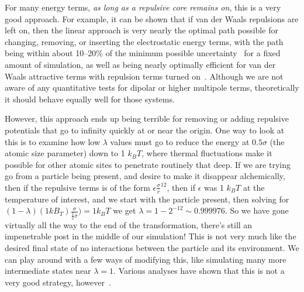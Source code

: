 \documentclass[9pt,bestpractices]{livecoms}
\begin{document}
For many energy terms, \textit{as long as a repulsive core remains on}, this is a very good approach. For example, it can be shown that if van der Waals repulsions are left on, then the linear approach is very nearly the optimal path possible for changing, removing, or inserting the electrostatic energy terms, with the path being within about 10--20\% of the minimum possible uncertainty~\cite{naden2015linear} for a fixed amount of simulation, as well as being nearly optimally efficient for van der Waals attractive terms with repulsion terms turned on~\cite{naden2014linear}. Although we are not aware of any quantitative tests for dipolar or higher multipole terms, theoretically it should behave equally well for those systems.

However, this approach ends up being terrible for removing or adding repulsive potentials that go to infinity quickly at or near the origin. One way to look at this is to examine how low $\lambda$ values must go to reduce the energy at $0.5\sigma$ (the atomic size parameter) down to 1 $k_BT$, where thermal fluctuations make it possible for other atomic sites to penetrate routinely that deep. If we are trying go from a particle being present, and desire to make it disappear alchemically, then if the repulsive terms is of the form $\epsilon\frac{\sigma}{r}^{12}$, then if $\epsilon$ was 1 $k_BT$ at the temperature of interest, and we start with the particle present, then solving for $(1-\lambda)(1 kB_T)\frac{\sigma}{\frac{1}{2}\sigma}) = 1 k_B T$ we get $\lambda = 1-2^{-12} \sim 0.999976$. So we have gone virtually all the way to the end of the transformation, there's still an impenetrable post in the middle of our simulation! This is not very much like the desired final state of no interactions between the particle and its environment. We can play around with a few ways of modifying this, like simulating many more intermediate states near $\lambda=1$. Various analyses have shown that this is not a very good strategy, however~\cite{pham2011identifying, beutler1994avoiding, zacharias1994separationshifted, blondel2004ensemble, gapsys2012new}.
\end{document}

